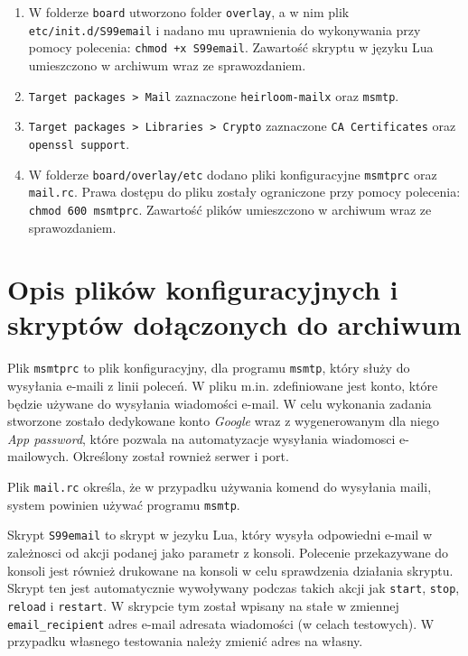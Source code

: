 \documentclass{article}
\begin{document}
\begin{enumerate}[label=\arabic*.]
    \item W folderze \texttt{board} utworzono folder \texttt{overlay}, a w nim plik \texttt{etc/init.d/S99email} i nadano mu uprawnienia do wykonywania przy pomocy polecenia: \texttt{chmod +x S99email}. Zawartość skryptu w języku Lua umieszczono w archiwum wraz ze sprawozdaniem.
    \item \texttt{Target packages > Mail} zaznaczone \texttt{heirloom-mailx} oraz \texttt{msmtp}.
    \item \texttt{Target packages > Libraries > Crypto} zaznaczone \texttt{CA Certificates} oraz \texttt{openssl support}.
    \item W folderze \texttt{board/overlay/etc} dodano pliki konfiguracyjne \texttt{msmtprc} oraz \texttt{mail.rc}. Prawa dostępu do pliku zostały ograniczone przy pomocy polecenia: \texttt{chmod 600 msmtprc}. Zawartość plików umieszczono w archiwum wraz ze sprawozdaniem. 
\end{enumerate}

\section{Opis plików konfiguracyjnych i skryptów dołączonych do archiwum}

Plik \texttt{msmtprc} to plik konfiguracyjny, dla programu \texttt{msmtp}, który służy do wysyłania e-maili z linii poleceń. W pliku m.in. zdefiniowane jest konto, które będzie używane do wysyłania wiadomości e-mail. W celu wykonania zadania stworzone zostało dedykowane konto \textit{Google} wraz z wygenerowanym dla niego \textit{App password}, które pozwala na automatyzacje wysyłania wiadomosci e-mailowych. Określony został rownież serwer i port.

Plik \texttt{mail.rc} określa, że w przypadku używania komend do wysyłania maili, system powinien używać programu \texttt{msmtp}.

Skrypt \texttt{S99email} to skrypt w jezyku Lua, który wysyła odpowiedni e-mail w zależnosci od akcji podanej jako parametr z konsoli. Polecenie przekazywane do konsoli jest również drukowane na konsoli w celu sprawdzenia działania skryptu. Skrypt ten jest automatycznie wywoływany podczas takich akcji jak \texttt{start}, \texttt{stop}, \texttt{reload} i \texttt{restart}. W skrypcie tym został wpisany na stałe w zmiennej \texttt{email\_recipient} adres e-mail adresata wiadomości (w celach testowych). W przypadku własnego testowania należy zmienić adres na własny.

\newpage
\end{document}
